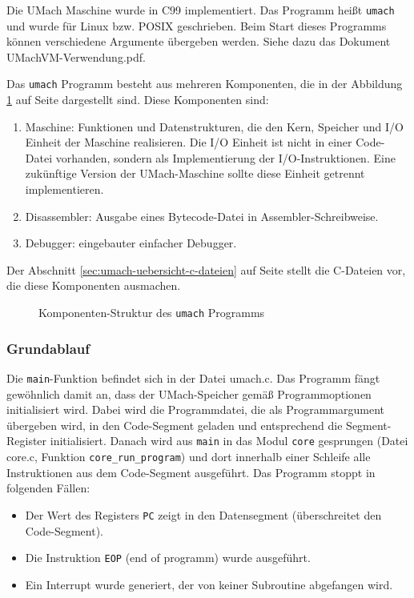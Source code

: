 Die UMach Maschine wurde in C99 implementiert. Das Programm heißt \texttt{umach}
und wurde für Linux bzw. POSIX geschrieben. Beim Start dieses Programms können
verschiedene Argumente übergeben werden. Siehe dazu das Dokument
UMachVM-Verwendung.pdf. 

Das \texttt{umach} Programm besteht aus mehreren Komponenten, die in der
Abbildung \ref{fig:umachstruktur} auf Seite \pageref{fig:umachstruktur}
dargestellt sind. Diese Komponenten sind:

\begin{enumerate}
  \item Maschine: Funktionen und Datenstrukturen, die den Kern, Speicher und
     I/O Einheit der Maschine realisieren. Die I/O Einheit ist nicht in einer
     Code-Datei vorhanden, sondern als Implementierung der I/O-Instruktionen.
     Eine zukünftige Version der UMach-Maschine sollte diese Einheit getrennt
     implementieren.
  \item Disassembler: Ausgabe eines Bytecode-Datei in Assembler-Schreibweise.
  \item Debugger: eingebauter einfacher Debugger.
\end{enumerate}

Der Abschnitt \ref{sec:umach-uebersicht-c-dateien} auf Seite
\pageref{sec:umach-uebersicht-c-dateien} stellt die C-Dateien vor, die diese
Komponenten ausmachen.

\begin{figure}[h!tp]
\centering

\caption[Struktur des umach Programms]
{Komponenten-Struktur des \texttt{umach} Programms}
\label{fig:umachstruktur}
\end{figure}





\subsubsection{Grundablauf}
Die \texttt{main}-Funktion befindet sich in der Datei umach.c. Das Programm
fängt gewöhnlich damit an, dass der UMach-Speicher gemäß Programmoptionen
initialisiert wird. Dabei wird die Programmdatei, die als Programmargument
übergeben wird, in den Code-Segment geladen und entsprechend die
Segment-Register initialisiert. Danach wird aus \texttt{main} in das Modul
\texttt{core} gesprungen (Datei core.c, Funktion \texttt{core\_run\_program})
und dort innerhalb einer Schleife alle Instruktionen aus dem Code-Segment
ausgeführt. Das Programm stoppt in folgenden Fällen:
\begin{itemize}
  \item Der Wert des Registers \texttt{PC} zeigt in den Datensegment
(überschreitet den Code-Segment).
  \item Die Instruktion \texttt{EOP} (end of programm) wurde ausgeführt.
  \item Ein Interrupt wurde generiert, der von keiner Subroutine abgefangen
wird.
\end{itemize}


